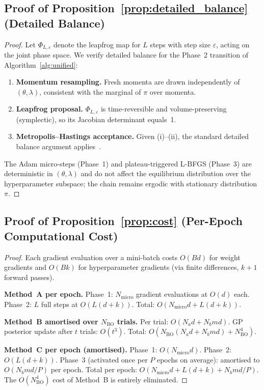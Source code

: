 \documentclass[11pt]{article}
\theoremstyle{definition}
\begin{document}
\subsection{Proof of Proposition~\ref{prop:detailed_balance} (Detailed Balance)}

\begin{proof}
Let $\Phi_{L,\varepsilon}$ denote the leapfrog map for $L$ steps with
step size $\varepsilon$, acting on the joint phase space.
We verify detailed balance for the Phase~2 transition of
Algorithm~\ref{alg:unified}:
\begin{enumerate}[label=(\roman*)]
  \item \textbf{Momentum resampling.} Fresh momenta are drawn
        independently of $(\theta,\lambda)$, consistent with the
        marginal of $\pi$ over momenta.

  \item \textbf{Leapfrog proposal.} $\Phi_{L,\varepsilon}$ is
        time-reversible and volume-preserving (symplectic), so its
        Jacobian determinant equals~1.

  \item \textbf{Metropolis--Hastings acceptance.} Given (i)--(ii),
        the standard detailed balance argument applies~\cite[Prop.~5.2]{neal2011}.
\end{enumerate}
The Adam micro-steps (Phase~1) and plateau-triggered L-BFGS
(Phase~3) are deterministic in $(\theta,\lambda)$ and do not affect
the equilibrium distribution over the hyperparameter subspace; the
chain remains ergodic with stationary distribution~$\pi$.
\end{proof}

\subsection{Proof of Proposition~\ref{prop:cost} (Per-Epoch Computational Cost)}

\begin{proof}
Each gradient evaluation over a mini-batch costs $O(Bd)$
for weight gradients and $O(Bk)$ for hyperparameter gradients
(via finite differences, $k+1$ forward passes).

\textbf{Method~A per epoch.}
Phase~1: $N_{\mathrm{micro}}$ gradient evaluations at $O(d)$ each.
Phase~2: $L$ full steps at $O(L(d+k))$.
Total: $O(N_{\mathrm{micro}}d + L(d+k))$.

\textbf{Method~B amortised over $N_{\mathrm{BO}}$ trials.}
Per trial: $O(N_a d + N_b md)$.
GP posterior update after $t$ trials: $O(t^3)$.
Total: $O\!\left(N_{\mathrm{BO}}(N_a d + N_b md) + N_{\mathrm{BO}}^4\right)$.

\textbf{Method~C per epoch (amortised).}
Phase~1: $O(N_{\mathrm{micro}}d)$.
Phase~2: $O(L(d+k))$.
Phase~3 (activated once per $P$ epochs on average):
amortised to $O(N_b md/P)$ per epoch.
Total per epoch: $O(N_{\mathrm{micro}}d + L(d+k) + N_b md/P)$.
The $O(N_{\mathrm{BO}}^4)$ cost of Method~B is
entirely eliminated.
\end{proof}
\end{document}
